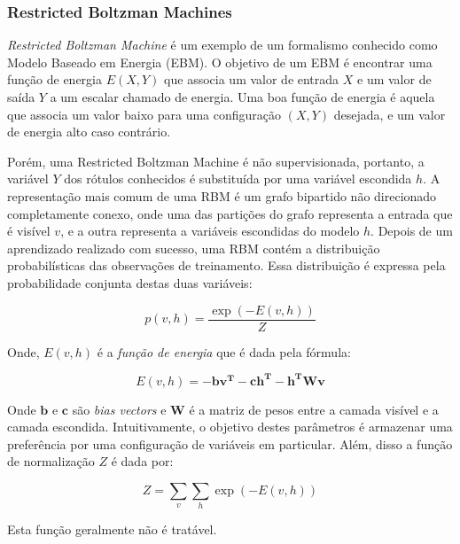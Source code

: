 \subsubsection{Restricted Boltzman Machines}

\emph{Restricted Boltzman Machine} é um exemplo de um formalismo conhecido como
Modelo Baseado em Energia (EBM). O objetivo de um EBM é encontrar uma função de
energia $E(X,Y)$ que associa um valor de entrada $X$ e um valor de saída $Y$ a
um escalar chamado de energia.  Uma boa função de energia é aquela que associa
um valor baixo para uma configuração $(X,Y)$ desejada, e um valor de energia
alto caso contrário.\citep{lecun2006tutorial}

Porém, uma Restricted Boltzman Machine é não supervisionada, portanto, a
variável $Y$ dos rótulos conhecidos é substituída por uma variável escondida
$h$. A representação mais comum de uma RBM é um grafo bipartido não direcionado
completamente conexo, onde uma das partições do grafo representa a entrada que
é visível $v$, e a outra representa a variáveis escondidas do modelo $h$.
Depois de um aprendizado realizado com sucesso, uma RBM contém a distribuição
probabilísticas das observações de treinamento.  Essa distribuição é expressa
pela probabilidade conjunta destas duas variáveis:

$$ p(v,h) = \frac{\exp(-E(v,h))}{Z}$$

Onde, $E(v,h)$ é a \emph{função de energia} que é dada pela fórmula:

$$E(v,h)=\mathbf{-bv^T-ch^T-h^{T}Wv}$$

Onde $\mathbf{b}$ e $\mathbf{c}$ são \emph{bias vectors} e $\mathbf{W}$ é a
matriz de pesos entre a camada visível e a camada escondida. Intuitivamente, o
objetivo destes parâmetros é armazenar uma preferência por uma configuração de
variáveis em particular. Além, disso a função de normalização $Z$ é dada por:

$$ Z = \sum_v \sum_h \exp(-E(v,h)) $$

Esta função geralmente não é tratável.

